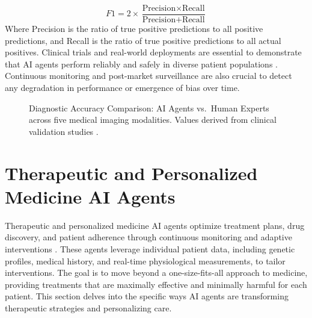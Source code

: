 \documentclass[12pt,a4paper]{article}
\begin{document}
\begin{equation}
\label{eq:f1-score}
F1 = 2 \times \frac{\text{Precision} \times \text{Recall}}{\text{Precision} + \text{Recall}}
\end{equation}
Where Precision is the ratio of true positive predictions to all positive predictions, and Recall is the ratio of true positive predictions to all actual positives. Clinical trials and real-world deployments are essential to demonstrate that AI agents perform reliably and safely in diverse patient populations \cite{rajpurkar2017chexnet}. Continuous monitoring and post-market surveillance are also crucial to detect any degradation in performance or emergence of bias over time.

\begin{figure}[H]
  \centering
  \caption{Diagnostic Accuracy Comparison: AI Agents vs.\ Human Experts across five medical imaging modalities. Values derived from clinical validation studies \cite{rajpurkar2017chexnet,mckinney2020international,esteva2017dermatologist,campanella2019deep}.}
  \label{fig:accuracy}
\end{figure}

\section{Therapeutic and Personalized Medicine AI Agents}
\label{sec:therapeutic-ai}
Therapeutic and personalized medicine AI agents optimize treatment plans, drug discovery, and patient adherence through continuous monitoring and adaptive interventions \cite{topol2019deep}. These agents leverage individual patient data, including genetic profiles, medical history, and real-time physiological measurements, to tailor interventions. The goal is to move beyond a one-size-fits-all approach to medicine, providing treatments that are maximally effective and minimally harmful for each patient. This section delves into the specific ways AI agents are transforming therapeutic strategies and personalizing care.
\end{document}
